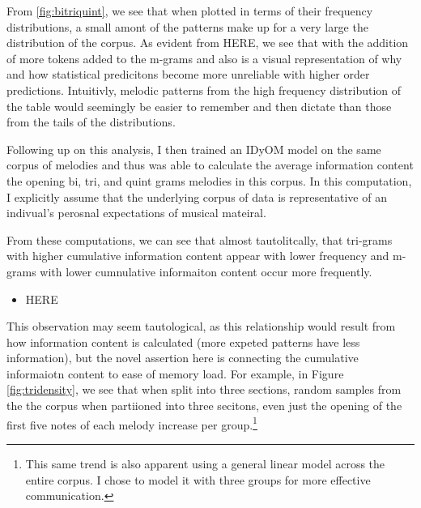 \documentclass[]{book}
\providecommand{\tightlist}{%
  \setlength{\itemsep}{0pt}\setlength{\parskip}{0pt}}
\let\rmarkdownfootnote\footnote%
\def\footnote{\protect\rmarkdownfootnote}
\begin{document}
From \ref{fig:bitriquint}, we see that when plotted in terms of their frequency distributions, a small amont of the patterns make up for a very large the distribution of the corpus.
As evident from HERE, we see that with the addition of more tokens added to the m-grams and also is a visual representation of why and how statistical predicitons become more unreliable with higher order predictions.
Intuitivly, melodic patterns from the high frequency distribution of the table would seemingly be easier to remember and then dictate than those from the tails of the distributions.

Following up on this analysis, I then trained an IDyOM model on the same corpus of melodies and thus was able to calculate the average information content the opening bi, tri, and quint grams melodies in this corpus.
In this computation, I explicitly assume that the underlying corpus of data is representative of an indivual's perosnal expectations of musical mateiral.

From these computations, we can see that almost tautolitcally, that tri-grams with higher cumulative information content appear with lower frequency and m-grams with lower cumnulative informaiton content occur more frequently.

\begin{itemize}
\tightlist
\item
  HERE
\end{itemize}

This observation may seem tautological, as this relationship would result from how information content is calculated (more expeted patterns have less information), but the novel assertion here is connecting the cumulative informaiotn content to ease of memory load.
For example, in Figure \ref{fig:tridensity}, we see that when split into three sections, random samples from the the corpus when partiioned into three secitons, even just the opening of the first five notes of each melody increase per group.\footnote{This same trend is also apparent using a general linear model across the entire corpus. I chose to model it with three groups for more effective communication.}
\end{document}
